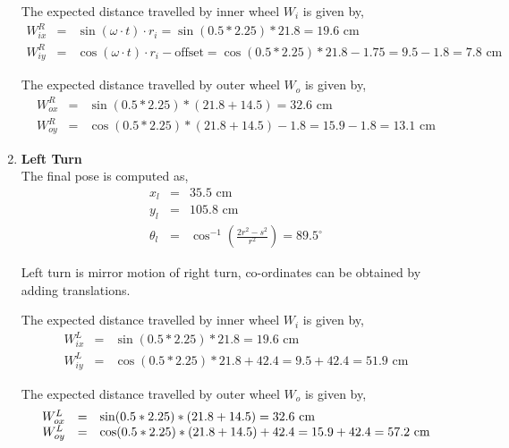 \begin{enumerate}
The expected distance travelled by inner wheel $W_i$ is given by,
\begin{equation}
\begin{array}{rcl}
W^R_{ix} &=& \sin(\omega \cdot t) \cdot r_i = \sin(0.5 * 2.25) * 21.8 = 19.6 \text{ cm} \\
W^R_{iy} &=& \cos(\omega \cdot t) \cdot r_i - \text{offset} =  \cos(0.5 * 2.25) * 21.8 - 1.75 = 9.5 - 1.8 = 7.8 \text{ cm}
\end{array}
\end{equation}

The expected distance travelled by outer wheel $W_o$ is given by,
\begin{equation}
\begin{array}{rcl}
W^R_{ox} &=& \sin(0.5 * 2.25) * (21.8 + 14.5) = 32.6 \text{ cm} \\
W^R_{oy} &=& \cos(0.5 * 2.25) * (21.8 + 14.5) - 1.8 = 15.9 - 1.8 = 13.1 \text{ cm}
\end{array}
\end{equation}

\item \textbf{Left Turn} \\
The final pose is computed as,
\begin{equation}
\begin{array}{rcl}
x_l &=& 35.5 \text{ cm} \\
y_l &=& 105.8 \text{ cm} \\
\theta_l &=& \cos^{-1}\left(\frac{2r^2 - s^2}{r^2}\right) = 89.5^{\circ}
\end{array}
\end{equation}
	
Left turn is mirror motion of right turn, co-ordinates can be obtained by adding translations. 

The expected distance travelled by inner wheel $W_i$ is given by,
\begin{equation}
\begin{array}{rcl}
W^L_{ix} &=& \sin(0.5 * 2.25) * 21.8 = 19.6 \text{ cm} \\
W^L_{iy} &=& \cos(0.5 * 2.25) * 21.8 + 42.4 = 9.5 + 42.4 = 51.9 \text{ cm}
\end{array}
\end{equation}

The expected distance travelled by outer wheel $W_o$ is given by,
\begin{equation}
\begin{array}{rcl}
W^L_{ox} &=& \sin(0.5 * 2.25) * (21.8 + 14.5) = 32.6 \text{ cm}\\
W^L_{oy} &=& \cos(0.5 * 2.25) * (21.8 + 14.5) + 42.4 = 15.9 + 42.4 = 57.2 \text{ cm}$$
\end{array}
\end{equation}
	
\end{enumerate}

